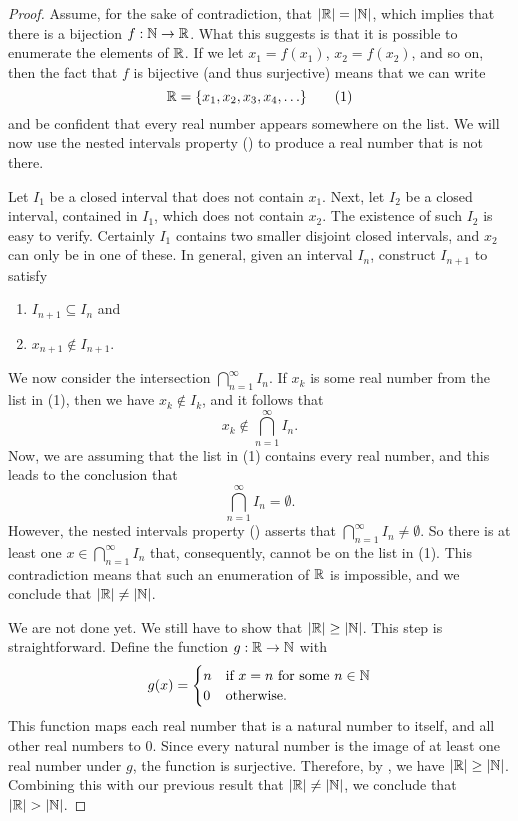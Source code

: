 \begin{proof}
  Assume, for the sake of contradiction, that $| \mathbb R | =
  | \mathbb N |$, which implies that there is a bijection $f : \mathbb N \to
  \mathbb R$. What this suggests is that it is possible to enumerate the
  elements of $\mathbb R$. If we let $x_1 = f(x_1)$, $x_2 = f(x_2)$, and so
  on, then the fact that $f$ is bijective (and thus surjective) means
  that we can write
  \[ \RR = \set{x_1, x_2, x_3, x_4, \dots} \tag{1} \]
  and be confident that every real number appears somewhere on the
  list. We will now use the nested intervals property
  () to produce a real number that
  is not there.

  Let $I_1$ be a closed interval that does not contain $x_1$. Next,
  let $I_2$ be a closed interval, contained in $I_1$, which does not
  contain $x_2$. The existence of such $I_2$ is easy to verify.
  Certainly $I_1$ contains two smaller disjoint closed intervals, and
  $x_2$ can only be in one of these. In general, given an interval
  $I_n$, construct $I_{n + 1}$ to satisfy
  \begin{enumerate}
    \item $I_{n + 1} \subseteq I_n$ and
    \item $x_{n + 1} \notin I_{n + 1}$.
  \end{enumerate}
  We now consider the intersection $\bigcap_{n = 1}^{\infty} I_n$. If
  $x_k$ is some real number from the list in (1), then we have $x_k
  \notin I_k$, and it follows that
  \[ x_k \notin \bigcap_{n = 1}^{\infty} I_n. \]
  Now, we are assuming that the list in (1) contains every real
  number, and this leads to the conclusion that
  \[ \bigcap_{n = 1}^{\infty} I_n = \emptyset. \]
  However, the nested intervals property
  () asserts that $\bigcap_{n =
  1}^{\infty} I_n \neq \emptyset$. So there is at least one $x \in
  \bigcap_{n = 1}^{\infty} I_n$ that, consequently, cannot be on the
  list in (1). This contradiction means that such an enumeration of
  $\mathbb R$ is impossible, and we conclude that $| \mathbb R | \neq | \mathbb N |$.

  We are not done yet. We still have to show that $| \mathbb R | \geq
  | \mathbb N |$. This step is straightforward. Define the function $g :
  \mathbb R \to \mathbb N$ with
  \begin{align*}
    g(x) =
    \begin{cases}
      n & \text{if $x = n$ for some $n \in \mathbb N$} \\
      0 & \text{otherwise}.
    \end{cases}
  \end{align*}
  This function maps each real number that is a natural number to
  itself, and all other real numbers to 0. Since every natural number
  is the image of at least one real number under $g$, the function is
  surjective. Therefore, by , we have
  $| \mathbb R | \geq | \mathbb N |$. Combining this with our previous
  result that $| \mathbb R | \neq | \mathbb N |$, we conclude that
  $| \mathbb R | > | \mathbb N |$.
\end{proof}

